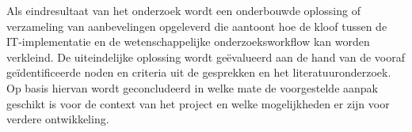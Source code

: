 Als eindresultaat van het onderzoek wordt een onderbouwde oplossing of verzameling van aanbevelingen opgeleverd die aantoont hoe de kloof tussen de IT-implementatie en de wetenschappelijke onderzoeksworkflow kan worden verkleind. De uiteindelijke oplossing wordt ge\"evalueerd aan de hand van de vooraf ge\"identificeerde noden en criteria uit de gesprekken en het literatuuronderzoek. Op basis hiervan wordt geconcludeerd in welke mate de voorgestelde aanpak geschikt is voor de context van het project en welke mogelijkheden er zijn voor verdere ontwikkeling.


















